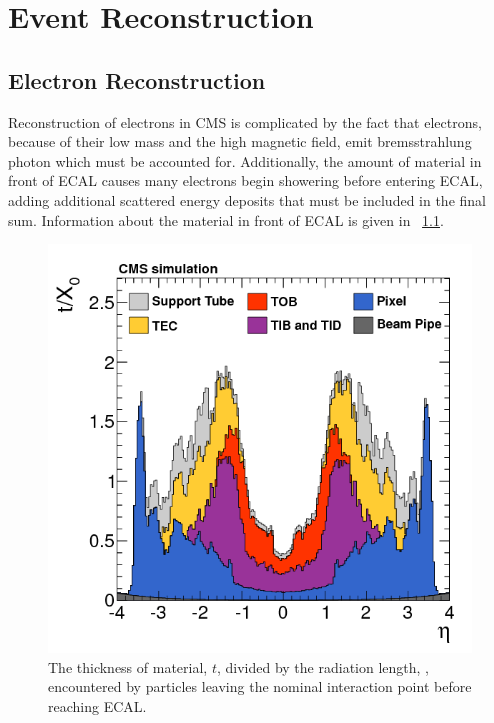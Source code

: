 \chapter{Event Reconstruction}
\label{reconstruction_chapter}

\section{Electron Reconstruction}
\label{sec:electron_reconstruction}

Reconstruction of electrons in CMS is complicated by the fact that electrons,
because of their low mass and the high magnetic field, emit bremsstrahlung
photon which must be accounted for. Additionally, the amount of material in
front of ECAL causes many electrons begin showering before entering ECAL,
adding additional scattered energy deposits that must be included in the final
sum. Information about the material in front of ECAL is given in
\FIG~\ref{fig:tracker_material}\cite{cms_tracker_2014}.

\begin{figure}[tb]
    \centering
    \includegraphics[width=\textwidth]{figures/tracker_material_budget.png}
    \caption{
        The thickness of material, $t$, divided by the radiation length,
        \radiationlength, encountered by particles leaving the nominal
        interaction point before reaching ECAL.
    }
    \label{fig:tracker_material}
\end{figure}

